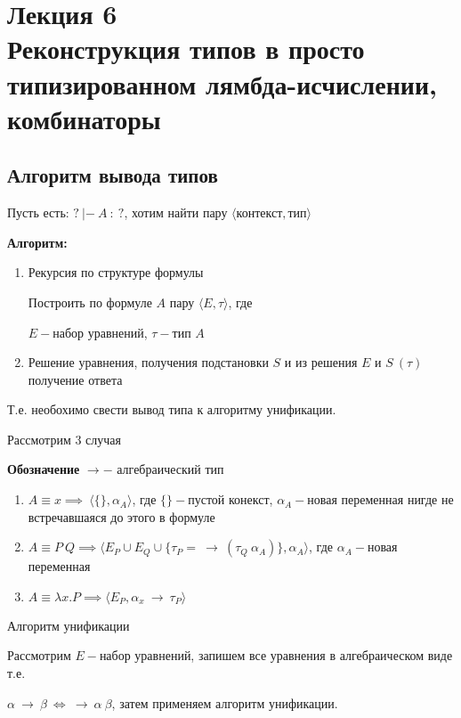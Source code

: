 				
		
		
		
		\section{Лекция 6 \\ Реконструкция типов в просто типизированном лямбда-исчислении, комбинаторы}
		\subsection{Алгоритм вывода типов}
					
			Пусть есть: $?\:|-\:A\: :\: ?$, хотим найти пару $\big \langle \text{контекст}, \text{тип} \big \rangle$\par
	\textbf{Алгоритм:}
	\begin{enumerate}
		\item Рекурсия по структуре формулы\par Построить по формуле $A$ пару $\big \langle E, \tau\big \rangle$, где\par $E-$набор уравнений, $\tau-$тип $A$
		\item Решение уравнения, получения подстановки $S$ и из решения $E$ и $S\:(\tau)$ получение ответа	
	\end{enumerate}
		Т.е. необохимо свести вывод типа к алгоритму унификации.\par
		\begin{oun_paragraph}Рассмотрим 3 случая\end{oun_paragraph}
			\textbf{Обозначение } $\rightarrow-$ алгебраический тип 
			\begin{enumerate}
				\item $A\equiv x\implies\:\big \langle \{\}, \alpha_A\big\rangle$, где $\{\}-$пустой конекст, $\alpha_A-$новая переменная нигде не встречавшаяся до этого в формуле
				\item $A\equiv P\:Q\implies\big \langle E_P\cup E_Q\cup \{\tau_P=\:\rightarrow\:(\tau_Q\:\alpha_A)\}, \alpha_A\big \rangle$, где $\alpha_A-$новая переменная
				\item $A\equiv\lambda x.P\implies\big\langle E_P,\alpha_x\:\rightarrow\:\tau_P\big\rangle$
			\end{enumerate}
		\begin{oun_paragraph}Алгоритм унификации\end{oun_paragraph} 
			Рассмотрим $E-$набор уравнений, запишем все уравнения в алгебраическом виде т.е. \par $\alpha\:\rightarrow\:\beta\:\Leftrightarrow\:\rightarrow\:\alpha\:\beta$, затем применяем алгоритм унификации.
